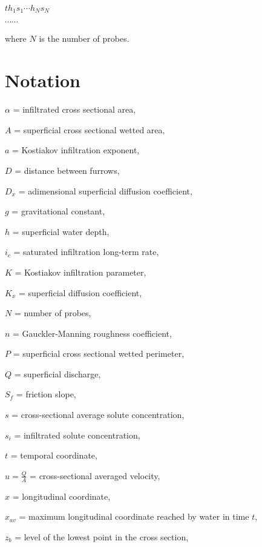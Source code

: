 \documentclass[a4paper,12pt]{report}
\begin{document}
\hspace{1.8cm}$t$\hspace{0.9cm}$h_1$\hspace{0.9cm}$s_1$\hspace{0.9cm}$\cdots$\hspace{0.9cm}$h_N$\hspace{0.9cm}$s_N$

\hspace{3.8cm} $\cdots \cdots$

\noindent where $N$ is the number of probes. 

\clearpage
\section*{Notation}

\begin{description}
\item $\alpha$ = infiltrated cross sectional area,
\item $A$ = superficial cross sectional wetted area,
\item $a$ = Kostiakov infiltration exponent,
\item $D$ = distance between furrows,
\item $D_x$ = adimensional superficial diffusion coefficient,
\item $g$ = gravitational constant,
\item $h$ = superficial water depth, 
\item $i_c$ = saturated infiltration long-term rate, 
\item $K$ = Kostiakov infiltration parameter, 
\item $K_x$ = superficial diffusion coefficient,
\item $N$ = number of probes, 
\item $n$ = Gauckler-Manning roughness coefficient,
\item $P$ = superficial cross sectional wetted perimeter,
\item $Q$ = superficial discharge,
\item $S_f$ = friction slope,
\item $s$ = cross-sectional average solute concentration,
\item $s_i$ = infiltrated solute concentration,
\item $t$ = temporal coordinate,
\item $u=\frac{Q}{A}$ = cross-sectional averaged velocity,
\item $x$ = longitudinal coordinate,
\item $x_{av}$ = maximum longitudinal coordinate reached by water in time $t$,
\item $z_b$ = level of the lowest point in the cross section,
\end{description}
\end{document}
